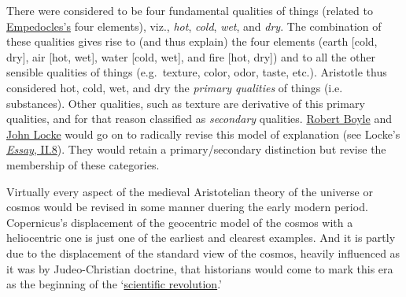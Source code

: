 \documentclass[12pt]{article}
\begin{document}
There were considered to be four fundamental qualities of things (related to
\href{http://plato.stanford.edu/entries/empedocles/}{Empedocles's} four elements), viz., \emph{hot}, \emph{cold}, \emph{wet}, and \emph{dry}. The combination of these
qualities gives rise to (and thus explain) the four elements (earth [cold, dry], air
[hot, wet], water [cold, wet], and fire [hot, dry]) and to all the other sensible
qualities of things (e.g. texture, color, odor, taste, etc.). Aristotle thus
considered hot, cold, wet, and dry the \emph{primary qualities} of things (i.e. substances).
Other qualities, such as texture are derivative of this primary qualities, and for
that reason classified as \emph{secondary} qualities. \href{http://plato.stanford.edu/entries/boyle/}{Robert Boyle} and \href{http://plato.stanford.edu/entries/locke/}{John Locke} would go
on to radically revise this model of explanation (see Locke's \href{http://www.earlymoderntexts.com/assets/pdfs/locke1690book2\_1.pdf}{\emph{Essay}, II.8}). They
would retain a primary/secondary distinction but revise the membership of these
categories.

Virtually every aspect of the medieval Aristotelian theory of the universe or cosmos
would be revised in some manner duering the early modern period. Copernicus's
displacement of the geocentric model of the cosmos with a heliocentric one is just
one of the earliest and clearest examples. And it is partly due to the displacement
of the standard view of the cosmos, heavily influenced as it was by Judeo-Christian
doctrine, that historians would come to mark this era as the beginning of the
`\href{https://en.wikipedia.org/wiki/Scientific\_revolution}{scientific revolution}.'
\end{document}
